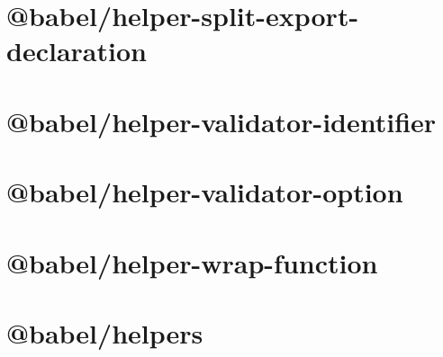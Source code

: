 \documentclass[twoside]{book}
\newcommand{\+}{\discretionary{\mbox{\scriptsize$\hookleftarrow$}}{}{}}
\begin{document}
\chapter{@babel/helper-\/split-\/export-\/declaration}
\label{md__c___users_vaishnavi_jadhav__desktop__developer_code_mean_stack_example_client_node_modules__3636e3c23acc604a7cf9915a43de06d5}

\chapter{@babel/helper-\/validator-\/identifier}
\label{md__c___users_vaishnavi_jadhav__desktop__developer_code_mean_stack_example_client_node_modules__57cbce629de368d89c3b14ea1b542eac}

\chapter{@babel/helper-\/validator-\/option}
\label{md__c___users_vaishnavi_jadhav__desktop__developer_code_mean_stack_example_client_node_modules__1a1db7974ebf1f8606e12590678fbab4}

\chapter{@babel/helper-\/wrap-\/function}
\label{md__c___users_vaishnavi_jadhav__desktop__developer_code_mean_stack_example_client_node_modules__2f59fcd76b15a5633c0ad50c3a4786ba}

\chapter{@babel/helpers}
\label{md__c___users_vaishnavi_jadhav__desktop__developer_code_mean_stack_example_client_node_modules__babel_helpers__r_e_a_d_m_e}

\end{document}
